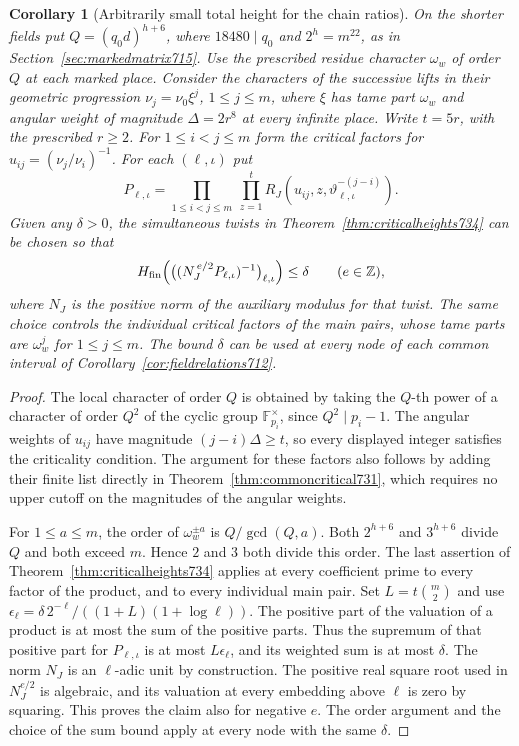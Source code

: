 \documentclass[a4paper,11pt]{article}
\newtheorem{corollary}[proposition]{Corollary}
\theoremstyle{definition}
\theoremstyle{remark}
\newcommand{\ZZ}{\mathbb Z}\newcommand{\ord}{\operatorname{ord}}
\numberwithin{equation}{section}
\begin{document}
\begin{corollary}[Arbitrarily small total height for the chain ratios]\leavevmode
\label{cor:quotientchainheight734}
On the shorter fields put \(Q=(q_0d)^{h+6}\), where \(18480\mid q_0\)
and \(2^h=m^{22}\), as in Section~\ref{sec:markedmatrix715}.
Use the prescribed residue character \(\omega_w\) of order \(Q\)
at each marked place. Consider the characters of the successive
lifts in their geometric progression \(\nu_j=\nu_0\xi^j\),
\(1\le j\le m\), where \(\xi\) has tame part \(\omega_w\)
and angular weight of magnitude \(\Delta=2r^8\) at every infinite
place. Write \(t=5r\), with the prescribed \(r\ge2\).
For \(1\le i<j\le m\) form the critical factors for
\(u_{ij}=(\nu_j/\nu_i)^{-1}\). For each \((\ell,\iota)\) put
\[
 P_{\ell,\iota}=
 \prod_{1\le i<j\le m}\ \prod_{z=1}^{t}
       R_J(u_{ij},z,\vartheta_{\ell,\iota}^{-(j-i)}).
\]
Given any \(\delta>0\), the simultaneous twists in
Theorem~\ref{thm:criticalheights734} can be chosen so that
\[
 H_{\rm fin}\!\left(
      \big((N_J^{\,e/2}P_{\ell,\iota})^{-1}\big)_{\ell,\iota}
                 \right)\le\delta
                           \qquad(e\in\ZZ),
\]
where \(N_J\) is the positive norm of the auxiliary modulus for
that twist. The same choice controls the individual critical factors
of the main pairs, whose tame parts are \(\omega_w^j\) for
\(1\le j\le m\). The bound \(\delta\) can be used at every node of
each common interval of Corollary~\ref{cor:fieldrelations712}.
\end{corollary}
\begin{proof}
The local character of order \(Q\) is obtained by taking the
\(Q\)-th power of a character of order \(Q^2\) of the cyclic group
\(\mathbb F_{p_i}^{\times}\), since \(Q^2\mid p_i-1\).
The angular weights of \(u_{ij}\) have magnitude
\((j-i)\Delta\ge t\), so every displayed integer satisfies the
criticality condition. The argument for these factors also follows
by adding their finite list directly in
Theorem~\ref{thm:commoncritical731}, which requires no upper
cutoff on the magnitudes of the angular weights.

For \(1\le a\le m\), the order of \(\omega_w^{\pm a}\) is
\(Q/\gcd(Q,a)\). Both \(2^{h+6}\) and \(3^{h+6}\) divide \(Q\)
and both exceed \(m\). Hence \(2\) and \(3\) both divide this
order. The last assertion of Theorem~\ref{thm:criticalheights734}
applies at every coefficient prime to every factor of the product,
and to every individual main pair. Set \(L=t\binom{m}{2}\) and use
\(\epsilon_\ell=\delta\,2^{-\ell}/((1+L)(1+\log\ell))\).
The positive part of the valuation of a product is at most the
sum of the positive parts. Thus the supremum of that positive part
for \(P_{\ell,\iota}\) is at most \(L\epsilon_\ell\), and its
weighted sum is at most \(\delta\). The norm \(N_J\) is an
\(\ell\)-adic unit by construction. The positive real square root
used in \(N_J^{e/2}\) is algebraic, and its valuation at every
embedding above \(\ell\) is zero by squaring. This proves the claim
also for negative \(e\). The order argument and the choice of the
sum bound apply at every node with the same \(\delta\).
\end{proof}
\end{document}
